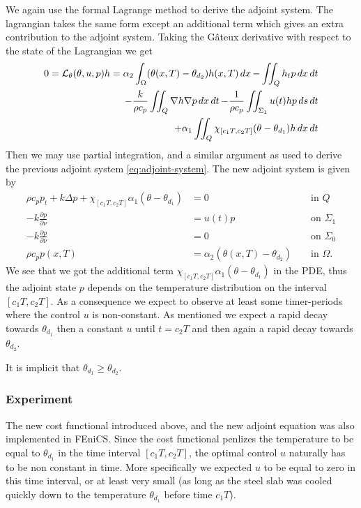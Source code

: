 We again use the formal Lagrange method to derive the adjoint system. The lagrangian takes the same form except an additional term which gives an extra contribution to the adjoint system. Taking the Gâteux derivative with respect to the state of the Lagrangian we get
\begin{equation}
  \begin{aligned}
  0 = \mathcal{L}_\theta(\theta, u, p)h = \alpha_2 \int_\Omega (\theta(x,T) - \theta_{d_2})h(x, T)\mathop{dx} - \iint_Q h_t p\mathop{dx}\mathop{dt} \\
  - \frac{k}{\rho c_p}\iint_Q\nabla h\nabla p \mathop{dx}\mathop{dt}
  - \frac{1}{\rho c_p}\iint_{\Sigma_1} u(t)h p\mathop{ds}\mathop{dt} \\
  + \alpha_1 \iint_{Q}\chi_{[c_1T,c_2T]}(\theta - \theta_{d_1})h \mathop{dx}\mathop{dt}
  \end{aligned}
\end{equation}
Then we may use partial integration, and a similar argument as used to derive the previous adjoint system \eqref{eq:adjoint-system}. The new adjoint system is given by 
\begin{subequations}
   \begin{align*} 
      \rho c_p p_t + k\Delta p + \chi_{[c_1T,c_2T]}\alpha_1(\theta - \theta_{d_1})&= 0 &&\textrm{ in } Q  \\
      {-k}\frac{\partial p}{\partial\nu} &= u(t)p &&\textrm{ on } \Sigma_1  \\
      {-k}\frac{\partial p}{\partial\nu} &= 0 &&\textrm{ on } \Sigma_0  \\
      \rho c_p p(x, T) &= \alpha_2(\theta(x, T) - \theta_{d_2})  &&\textrm{ in } \Omega.
   \end{align*}
\end{subequations}
We see that we got the additional term $\chi_{[c_1T,c_2T]}\alpha_1(\theta-\theta_{d_1})$ in the PDE, thus the adjoint state $p$ depends on the temperature distribution on the interval $[c_1T,c_2T]$. As a consequence we expect to observe at least some timer-periods where the control $u$ is non-constant. As mentioned we expect a rapid decay towards $\theta_{d_1}$ then a constant $u$ until $t=c_2T$ and then again a rapid decay towards $\theta_{d_2}$. 

It is implicit that $\theta_{d_1} \geq \theta_{d_2}$.

\subsubsection{Experiment}

The new cost functional introduced above, and the new adjoint equation was also implemented in FEniCS. Since the cost functional penlizes the temperature to be equal to $\theta_{d_1}$ in the time interval $[c_1 T, c_2 T]$, the optimal control $u$ naturally has to be non constant in time. More specifically we expected $u$ to be equal to zero in this time interval, or at least very small (as long as the steel slab was cooled quickly down to the temperature $\theta_{d_1}$ before time $c_1 T$). 

